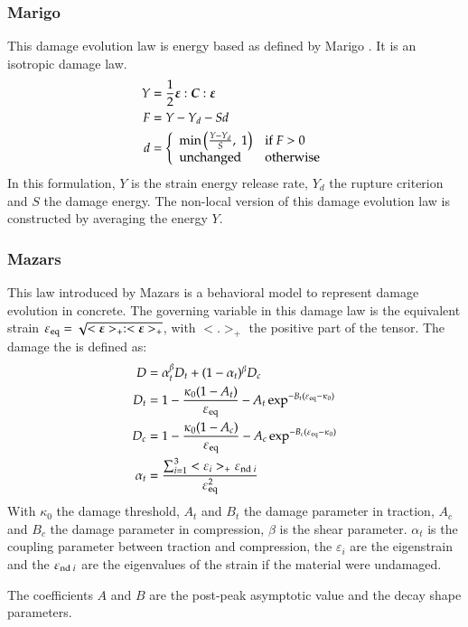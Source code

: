 \subsubsection{Marigo}
This damage evolution law is energy based as defined by Marigo \cite{marigo81a,
  lemaitre96a}. It is an isotropic damage law.
\begin{align}
  Y &= \frac{1}{2}\boldsymbol{\varepsilon}:\boldsymbol{C}:\boldsymbol{\varepsilon}\\
  F &= Y - Y_d - S d\\
  d &= \left\{
    \begin{array}{l l}
      \mathrm{min}\left(\frac{Y-Y_d}{S},\;1\right) & \mathrm{if}\; F > 0\\
      \mathrm{unchanged} & \mathrm{otherwise}
    \end{array}
  \right.
\end{align}
In this formulation, $Y$ is the strain energy release rate, $Y_d$ the
rupture criterion and $S$ the damage energy.  The non-local version of
this damage evolution law is constructed by averaging the energy $Y$.

\subsubsection{Mazars}
This law introduced by Mazars \cite{mazars84a} is a behavioral model to
represent damage evolution in concrete. The governing variable in this damage
law is the equivalent strain $\varepsilon_{{\mathrm{eq}}} =
\sqrt{<\boldsymbol{\varepsilon}>_+:<\boldsymbol{\varepsilon}>_+}$, with $<.>_+$ the positive
part of the tensor.
The damage the is defined as:
\begin{align}
  D &= \alpha_t^\beta D_t + (1-\alpha_t)^\beta D_c\\
  D_t &= 1 - \frac{\kappa_0 (1- A_t)}{\varepsilon_{{\mathrm{eq}}}} - A_t \exp^{-B_t(\varepsilon_{{\mathrm{eq}}}-\kappa_0)}\\
  D_c &= 1 - \frac{\kappa_0 (1- A_c)}{\varepsilon_{{\mathrm{eq}}}} - A_c
  \exp^{-B_c(\varepsilon_{{\mathrm{eq}}}-\kappa_0)}\\
  \alpha_t &= \frac{\sum_{i=1}^3<\varepsilon_i>_+\varepsilon_{{\mathrm{nd}}\;i}}{\varepsilon_{{\mathrm{eq}}}^2}
\end{align}
With $\kappa_0$ the damage threshold, $A_t$ and $B_t$ the damage parameter in
traction, $A_c$ and $B_c$ the damage parameter in compression, $\beta$ is the
shear parameter. $\alpha_t$ is the coupling parameter between traction and
compression, the $\varepsilon_i$ are the eigenstrain and the
$\varepsilon_{{\mathrm{nd}}\;i}$ are the eigenvalues of the strain if the material
were undamaged.

The coefficients $A$ and $B$ are the post-peak asymptotic
value and the decay shape parameters.




